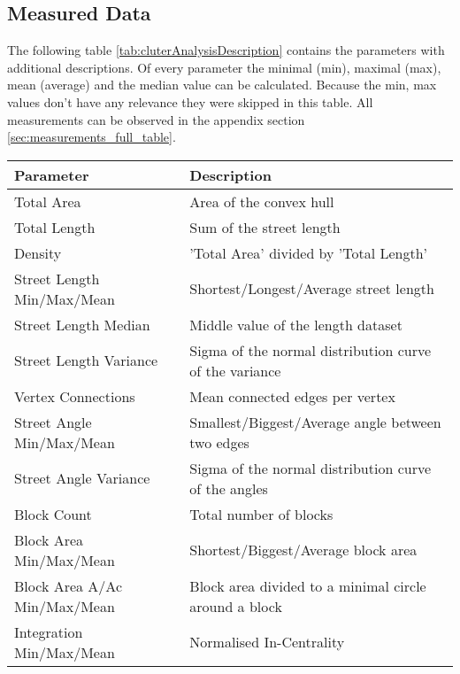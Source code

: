 \FloatBarrier
\subsection{Measured Data}
\label{sec:ClusterAnalysisMeasurements}
The following table \ref{tab:cluterAnalysisDescription} contains the parameters with additional descriptions. Of every parameter the minimal (min), maximal (max), mean (average) and the median value can be calculated. Because the min, max values don't have any relevance they were skipped in this table. All measurements can be observed in the appendix section \ref{sec:measurements_full_table}.

\begin{table}[!ht]
\centering
\begin{tabular}{ | l | l |} \hline
    \textbf{Parameter} & \textbf{Description} \\
    \hline

    Total Area &  Area of the convex hull \\
    Total Length & Sum of the street length \\
    Density & 'Total Area' divided by 'Total Length' \\
    \hline

    Street Length Min/Max/Mean & Shortest/Longest/Average street length  \\
    Street Length Median & Middle value of the length dataset \\
    Street Length Variance & Sigma of the normal distribution curve of the variance \\
    \hline

    Vertex Connections & Mean connected edges per vertex  \\
    \hline

    Street Angle Min/Max/Mean & Smallest/Biggest/Average angle between two edges \\
    Street Angle Variance & Sigma of the normal distribution curve of the angles \\
    \hline

    Block Count & Total number of blocks \\
    Block Area Min/Max/Mean & Shortest/Biggest/Average block area \\
    Block Area A/Ac Min/Max/Mean & Block area divided to a minimal circle around a block \\
    \hline

    Integration Min/Max/Mean & Normalised In-Centrality \\
    \hline


\end{tabular}
\end{table}
